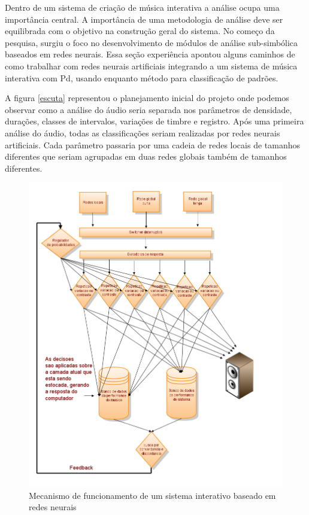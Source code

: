 \documentclass{ppgmus}
\begin{document}

Dentro de um sistema de criação de música interativa  a análise ocupa uma importância central. 
A importância de uma metodologia de análise deve ser equilibrada com o objetivo na construção geral do sistema.
No começo da pesquisa, surgiu o foco no desenvolvimento de módulos de análise sub-simbólica baseados em redes neurais.
Essa seção experiência apontou alguns caminhos de como trabalhar com redes neurais artificiais 
integrando a um sistema de música interativa com Pd, usando enquanto método para classificação de
padrões.

A figura \ref{escuta} representou o planejamento inicial do projeto onde podemos observar como a 
análise do áudio seria separada nos parâmetros de
densidade, durações, classes de intervalos, variações de timbre e registro. Após uma primeira análise do
áudio, todas as classificações seriam realizadas por redes neurais artificiais. Cada parâmetro passaria
 por uma cadeia de redes locais de tamanhos diferentes que seriam agrupadas em duas 
redes globais também de tamanhos diferentes.

\begin{figure}
\includegraphics[scale=.5]{mecanismo}
\caption{Mecanismo de funcionamento de um sistema interativo baseado em redes neurais}
\label{mecanismo}
\end{figure}
\end{document}
